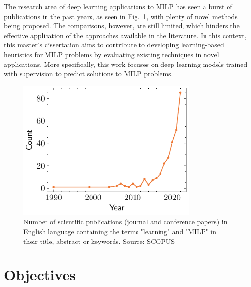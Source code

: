 The research area of deep learning applications to MILP has seen a burst of publications in the past years, as seen in Fig.~\ref{fig:scopus-trend}, with plenty of novel methods being proposed.
The comparisons, however, are still limited, which hinders the effective application of the approaches available in the literature.
In this context, this master’s dissertation aims to contribute to developing learning-based heuristics for MILP problems by evaluating existing techniques in novel applications.
More specifically, this work focuses on deep learning models trained with supervision to predict solutions to MILP problems.

\begin{figure}[h]
    \centering
    \includegraphics[width=0.8\textwidth]{pictures/scopus.pdf}
    \caption{Number of scientific publications (journal and conference papers) in English language containing the terms "learning" and "MILP" in their title, abstract or keywords. Source: SCOPUS}
    \label{fig:scopus-trend}
\end{figure}

\section{Objectives}\label{chap:objectives}

